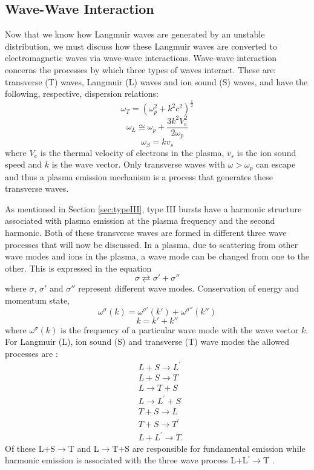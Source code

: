 \subsection{Wave-Wave Interaction}\label{Plasma Emission}
Now that we know how Langmuir waves are generated by an unstable distribution, we must discuss how these Langmuir waves are converted to electromagnetic waves via wave-wave interactions. Wave-wave interaction concerns the processes by which three types of waves interact. These are: transverse (T) waves, Langmuir (L) waves and ion sound (S) waves, and have the following, respective, dispersion relations:
$$ \omega_T=(\omega_p^2 +k^2c^2)^{\frac{1}{2}} $$
$$ \omega_L \cong \omega_p + \frac{3k^2V_e^2}{2 \omega_p}$$
$$ \omega_S = kv_s $$
where $V_e$ is the thermal velocity of electrons in the plasma, $v_s$ is the ion sound speed and $k$ is the wave vector. Only transverse waves with $\omega > \omega_p $ can escape and thus a plasma emission mechanism is a process that generates these transverse waves. 

As mentioned in Section \ref{sec:typeIII}, type III bursts have a harmonic structure associated with plasma emission at the plasma frequency and the second harmonic. Both of these transverse waves are formed in different three wave processes that will now be discussed.
In a plasma, due to scattering from other wave modes and ions in the plasma, a wave mode can be changed from one to the other. This is expressed in the equation 
$$ \sigma \rightleftarrows \sigma' + \sigma '' $$
where $\sigma$, $\sigma'$  and  $\sigma ''$ represent different wave modes. Conservation of energy and momentum state,
$$ \omega^{\sigma}(k)=\omega^{\sigma'}(k')+\omega^{\sigma''}(k'')$$
$$ k=k'+k''$$
where $ \omega^{\sigma}(k)$ is the frequency of a particular wave mode with the wave vector $k$. For Langmuir (L), ion sound (S) and transverse (T) wave modes the allowed processes are \citep{Melrose1987}:
\begin{align*}
& L+S \rightarrow L^\prime \\
& L+S \rightarrow T \\
& L \rightarrow T + S \\
& L \rightarrow L^\prime + S \\
& T+S \rightarrow L \\
& T+S\rightarrow T^\prime \\ 
& L+L^\prime \rightarrow T.
\end{align*}
Of these L+S$\rightarrow$T and L$\rightarrow$T+S are responsible for fundamental emission while harmonic emission is associated with the three wave process L+L$^\prime \rightarrow$T \citep{Melrose1987}.


